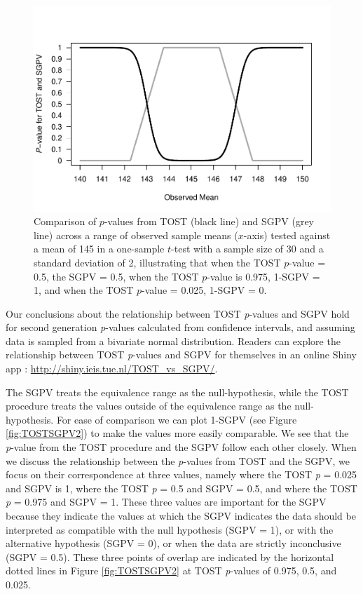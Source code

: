 \documentclass[
  english,
  man]{apa6}
\begin{document}
\begin{figure}

{\centering \includegraphics[height=0.94\textheight]{chp5_format-Rmd_bib_files/figure-latex/TOSTSGPV1-1} 

}

\caption{Comparison of $p$-values from TOST (black line) and SGPV (grey line) across a range of observed sample means ($x$-axis) tested against a mean of 145 in a one-sample $t$-test with a sample size of 30 and a standard deviation of 2, illustrating that when the TOST $p$-value = 0.5, the SGPV = 0.5, when the TOST $p$-value is 0.975, 1-SGPV = 1, and when the TOST $p$-value = 0.025, 1-SGPV = 0.}\label{fig:TOSTSGPV1}
\end{figure}

Our conclusions about the relationship between TOST \emph{p}-values and SGPV hold for second generation \emph{p}-values calculated from confidence intervals, and assuming data is sampled from a bivariate normal distribution. Readers can explore the relationship between TOST \emph{p}-values and SGPV for themselves in an online Shiny app : \url{http://shiny.ieis.tue.nl/TOST_vs_SGPV/}.

The SGPV treats the equivalence range as the null-hypothesis, while the TOST procedure treats the values outside of the equivalence range as the null-hypothesis. For ease of comparison we can plot 1-SGPV (see Figure \ref{fig:TOSTSGPV2}) to make the values more easily comparable. We see that the \emph{p}-value from the TOST procedure and the SGPV follow each other closely. When we discuss the relationship between the \emph{p}-values from TOST and the SGPV, we focus on their correspondence at three values, namely where the TOST \emph{p} = 0.025 and SGPV is 1, where the TOST \emph{p} = 0.5 and SGPV = 0.5, and where the TOST \emph{p} = 0.975 and SGPV = 1. These three values are important for the SGPV because they indicate the values at which the SGPV indicates the data should be interpreted as compatible with the null hypothesis (SGPV = 1), or with the alternative hypothesis (SGPV = 0), or when the data are strictly inconclusive (SGPV = 0.5). These three points of overlap are indicated by the horizontal dotted lines in Figure \ref{fig:TOSTSGPV2} at TOST \emph{p}-values of 0.975, 0.5, and 0.025.
\end{document}
